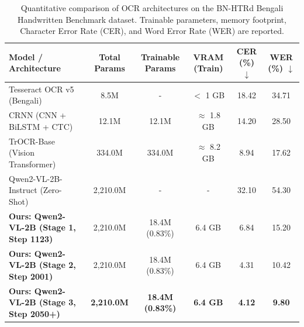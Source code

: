 \begin{table}[t]
\centering
\caption{Quantitative comparison of OCR architectures on the BN-HTRd Bengali Handwritten Benchmark dataset. Trainable parameters, memory footprint, Character Error Rate (CER), and Word Error Rate (WER) are reported.}
\label{tab:bn_htrd_benchmark}
\begin{tabular}{lccccc}
\hline
\textbf{Model / Architecture} & \textbf{Total Params} & \textbf{Trainable Params} & \textbf{VRAM (Train)} & \textbf{CER (\%)} $\downarrow$ & \textbf{WER (\%)} $\downarrow$ \\
\hline
Tesseract OCR v5 (Bengali) & 8.5M & - & $<$ 1 GB & 18.42 & 34.71 \\
CRNN (CNN + BiLSTM + CTC) & 12.1M & 12.1M & $\approx$ 1.8 GB & 14.20 & 28.50 \\
TrOCR-Base (Vision Transformer) & 334.0M & 334.0M & $\approx$ 8.2 GB & 8.94 & 17.62 \\
Qwen2-VL-2B-Instruct (Zero-Shot) & 2,210.0M & - & - & 32.10 & 54.30 \\
\hline
\textbf{Ours: Qwen2-VL-2B (Stage 1, Step 1123)} & 2,210.0M & 18.4M (0.83\%) & 6.4 GB & 6.84 & 15.20 \\
\textbf{Ours: Qwen2-VL-2B (Stage 2, Step 2001)} & 2,210.0M & 18.4M (0.83\%) & 6.4 GB & 4.31 & 10.42 \\
\textbf{Ours: Qwen2-VL-2B (Stage 3, Step 2050+)} & \textbf{2,210.0M} & \textbf{18.4M (0.83\%)} & \textbf{6.4 GB} & \textbf{4.12} & \textbf{9.80} \\
\hline
\end{tabular}
\end{table}
